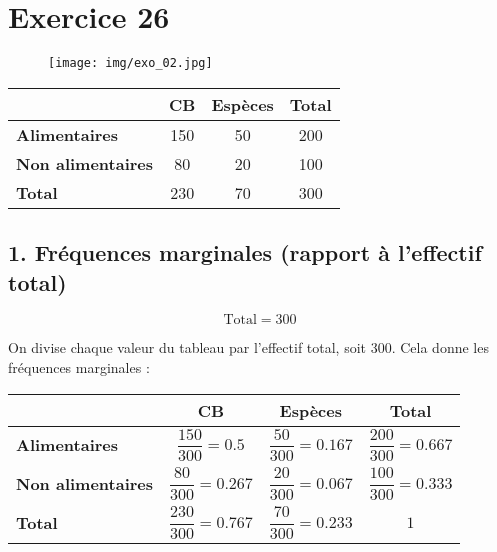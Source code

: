\documentclass[answers]{exam}
\begin{document}
\section*{Exercice 26}

\begin{figure}[H]
  \centering
  \texttt{[image: img/exo\_02.jpg]}
  \captionsetup{labelformat=empty}
\end{figure}

\begin{solution}

  \begin{center}
    \begin{tabular}{>{\bfseries}lccc}
    \toprule
                             & CB     & Espèces & Total \\
    \midrule
    Alimentaires             & 150    & 50      & 200   \\
    Non alimentaires         & 80     & 20      & 100   \\
    \midrule
    Total                    & 230    & 70      & 300   \\
    \bottomrule
    \end{tabular}
    \end{center}

    \subsection*{1. Fréquences marginales (rapport à l'effectif total)}

\[
\text{Total} = 300
\]

On divise chaque valeur du tableau par l'effectif total, soit 300. Cela donne les fréquences marginales :

\begin{center}
  \renewcommand{\arraystretch}{2}
  \begin{tabular}{>{\bfseries}lccc}
  \toprule
   & CB & Espèces & Total \\
  \midrule
  Alimentaires & $\dfrac{150}{300} = 0.5$ & $\dfrac{50}{300} = 0.167$ & $\dfrac{200}{300} = 0.667$ \\
  Non alimentaires & $\dfrac{80}{300} = 0.267$ & $\dfrac{20}{300} = 0.067$ & $\dfrac{100}{300} = 0.333$ \\
  \midrule
  Total & $\dfrac{230}{300} = 0.767$ & $\dfrac{70}{300} = 0.233$ & $1$ \\
  \bottomrule
  \end{tabular}
  \end{center}



\end{solution}
\end{document}
